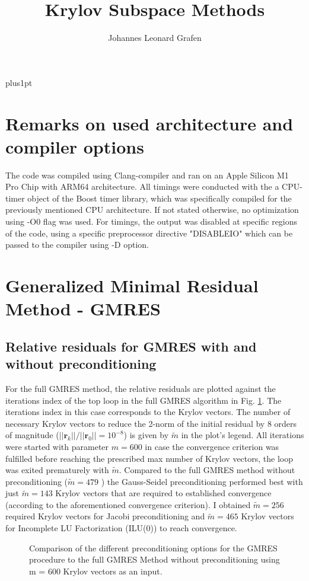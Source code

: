 \documentclass[11pt,a4paper]{article}
\title{Krylov Subspace Methods}
\author{Johannes Leonard Grafen}
\newcommand{\refFig}[1]{Fig. \ref{#1}}
\begin{document}
\renewcommand\baselinestretch{1.0}
\baselineskip=18pt plus1pt	
	
\maketitle
\tableofcontents
\listoffigures	%
\listoftables  %

\section{Remarks on used architecture and compiler options}
The code was compiled using Clang-compiler and ran on an Apple Silicon M1 Pro Chip with ARM64 architecture. All timings were conducted with the a CPU-timer object of the Boost timer library, which was specifically compiled for the previously mentioned CPU architecture. If not stated otherwise, no optimization using -O0 flag was used. For timings, the output was disabled at specific regions of the code, using a specific preprocessor directive "DISABLEIO" which can be passed to the compiler using -D option. 

\section{Generalized Minimal Residual Method - GMRES}
\label{chapter:GMRES}

\subsection{Relative residuals for GMRES with and without preconditioning}

For the full GMRES method, the relative residuals are plotted against the iterations index of the top loop in the full GMRES algorithm in \refFig{fig::Residuals}. The iterations index in this case corresponds to the Krylov vectors. The number of necessary Krylov vectors to reduce the 2-norm of the initial residual by 8 orders of magnitude ($||\mathbf{r}_k|| / ||\mathbf{r}_0|| = 10^{-8}$) is given by $\tilde{m}$ in the plot's legend. All iterations were started with parameter $m = 600$ in case the convergence criterion was fulfilled before reaching the prescribed max number of Krylov vectors, the loop was exited prematurely with $\tilde{m}$. Compared to the full GMRES method without preconditioning ($\tilde{m} = 479$ ) the Gauss-Seidel preconditioning performed best with just $\tilde{m} = 143$ Krylov vectors that are required to established convergence (according to the aforementioned convergence criterion). I obtained $\tilde{m} = 256$ required Krylov vectors for Jacobi preconditioning and $\tilde{m} = 465$ Krylov vectors for Incomplete LU Factorization (ILU(0)) to reach convergence.
%
\begin{figure}[!htbp]
	\centering
	\hspace*{0.8cm}
	\leavevmode
	\resizebox{0.9\width}{!}{}
	\caption{Comparison of the different preconditioning options for the GMRES procedure to the full GMRES Method without preconditioning using m = 600 Krylov vectors as an input.}
	\label{fig::Residuals}
\end{figure}
%
\end{document}
